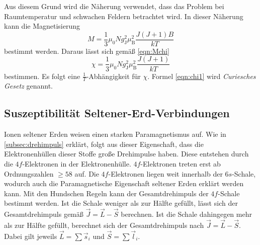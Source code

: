 Aus diesem Grund wird die Näherung verwendet, dass das Problem bei Raumtemperatur und schwachen Feldern betrachtet wird.
In dieser Näherung kann die Magnetisierung
\begin{equation*}
    M = \frac{1}{3}\mu_0 N g^2_{\text{J}} \mu^2_{\text{B}} \frac{J(J+1)B}{kT}
\end{equation*}
bestimmt werden.
Daraus lässt sich gemäß \autoref{eqn:Mchi}
\begin{equation}
    \label{eqn:chi1}
    \chi = \frac{1}{3}\mu_0 N g^2_{\text{J}} \mu^2_{\text{B}} \frac{J(J+1)}{kT}
\end{equation}  
bestimmen.
Es folgt eine $\frac{1}{T}$-Abhängigkeit für $\chi$. Formel \eqref{eqn:chi1} wird \textit{Curiesches Gesetz} genannt.

\subsection{Suszeptibilität Seltener-Erd-Verbindungen}
\label{subsec:suzepseltenererden}
Ionen seltener Erden weisen einen starken Paramagnetismus auf. Wie in \autoref{subsec:drehimpuls} erklärt, folgt aus dieser Eigenschaft, dass die Elektronenhüllen dieser Stoffe
große Drehimpulse haben. Diese entstehen durch die $4f$-Elektronen in der Elektronenhülle. $4f$-Elektronen treten erst ab Ordnungszahlen $\geq 58$ auf. Die $4f$-Elektronen liegen weit
innerhalb der $6s$-Schale, wodurch auch die Paramagnetische Eigenschaft seltener Erden erklärt werden kann. Mit den Hundschen Regeln kann der Gesamtdrehimpuls der $4f$-Schale
bestimmt werden. Ist die Schale weniger als zur Hälfte gefüllt, lässt sich der Gesamtdrehimpuls gemäß $\vec{J} = \vec{L} - \vec{S}$ berechnen. Ist die Schale dahingegen 
mehr als zur Hälfte gefüllt, berechnet sich der Gesamtdrehimpuls nach $\vec{J} = \vec{L} - \vec{S}$. Dabei gilt jeweils $\vec{L} = \sum \vec{s}_i$ und $\vec{S} = \sum \vec{l}_i$. 

